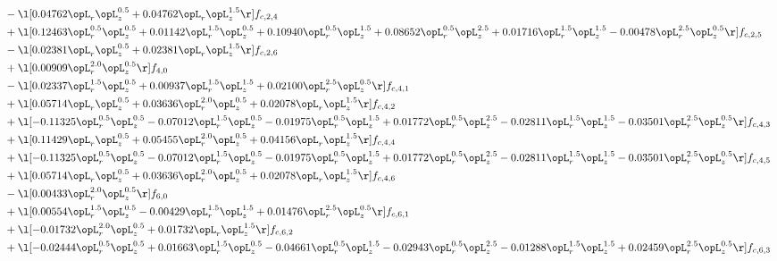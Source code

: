 \begin{alignat}{2}
& - \l[  0.04762 \opL_r \opL_z^{0.5} +  0.04762 \opL_r \opL_z^{1.5}  \r] f_{c,2,4} \nonumber \\ 
& + \l[  0.12463 \opL_r^{0.5} \opL_z^{0.5} +  0.01142 \opL_r^{1.5} \opL_z^{0.5} +  0.10940 \opL_r^{0.5} \opL_z^{1.5} +  0.08652 \opL_r^{0.5} \opL_z^{2.5} +  0.01716 \opL_r^{1.5} \opL_z^{1.5}   -0.00478 \opL_r^{2.5} \opL_z^{0.5}  \r] f_{c,2,5} \nonumber \\ 
& - \l[  0.02381 \opL_r \opL_z^{0.5} +  0.02381 \opL_r \opL_z^{1.5}  \r] f_{c,2,6} \nonumber \\ 
& + \l[  0.00909 \opL_r^{2.0} \opL_z^{0.5}  \r] f_{4,0} \nonumber \\ 
& - \l[  0.02337 \opL_r^{1.5} \opL_z^{0.5} +  0.00937 \opL_r^{1.5} \opL_z^{1.5} +  0.02100 \opL_r^{2.5} \opL_z^{0.5}  \r] f_{c,4,1} \nonumber \\ 
& + \l[  0.05714 \opL_r \opL_z^{0.5} +  0.03636 \opL_r^{2.0} \opL_z^{0.5} +  0.02078 \opL_r \opL_z^{1.5}  \r] f_{c,4,2} \nonumber \\ 
& + \l[  -0.11325 \opL_r^{0.5} \opL_z^{0.5}   -0.07012 \opL_r^{1.5} \opL_z^{0.5}   -0.01975 \opL_r^{0.5} \opL_z^{1.5} +  0.01772 \opL_r^{0.5} \opL_z^{2.5}   -0.02811 \opL_r^{1.5} \opL_z^{1.5}   -0.03501 \opL_r^{2.5} \opL_z^{0.5}  \r] f_{c,4,3} \nonumber \\ 
& + \l[  0.11429 \opL_r \opL_z^{0.5} +  0.05455 \opL_r^{2.0} \opL_z^{0.5} +  0.04156 \opL_r \opL_z^{1.5}  \r] f_{c,4,4} \nonumber \\ 
& + \l[  -0.11325 \opL_r^{0.5} \opL_z^{0.5}   -0.07012 \opL_r^{1.5} \opL_z^{0.5}   -0.01975 \opL_r^{0.5} \opL_z^{1.5} +  0.01772 \opL_r^{0.5} \opL_z^{2.5}   -0.02811 \opL_r^{1.5} \opL_z^{1.5}   -0.03501 \opL_r^{2.5} \opL_z^{0.5}  \r] f_{c,4,5} \nonumber \\ 
& + \l[  0.05714 \opL_r \opL_z^{0.5} +  0.03636 \opL_r^{2.0} \opL_z^{0.5} +  0.02078 \opL_r \opL_z^{1.5}  \r] f_{c,4,6} \nonumber \\ 
& - \l[  0.00433 \opL_r^{2.0} \opL_z^{0.5}  \r] f_{6,0} \nonumber \\ 
& + \l[  0.00554 \opL_r^{1.5} \opL_z^{0.5}   -0.00429 \opL_r^{1.5} \opL_z^{1.5} +  0.01476 \opL_r^{2.5} \opL_z^{0.5}  \r] f_{c,6,1} \nonumber \\ 
& + \l[  -0.01732 \opL_r^{2.0} \opL_z^{0.5} +  0.01732 \opL_r \opL_z^{1.5}  \r] f_{c,6,2} \nonumber \\ 
& + \l[  -0.02444 \opL_r^{0.5} \opL_z^{0.5} +  0.01663 \opL_r^{1.5} \opL_z^{0.5}   -0.04661 \opL_r^{0.5} \opL_z^{1.5}   -0.02943 \opL_r^{0.5} \opL_z^{2.5}   -0.01288 \opL_r^{1.5} \opL_z^{1.5} +  0.02459 \opL_r^{2.5} \opL_z^{0.5}  \r] f_{c,6,3} \nonumber \\ 

\end{alignat}

